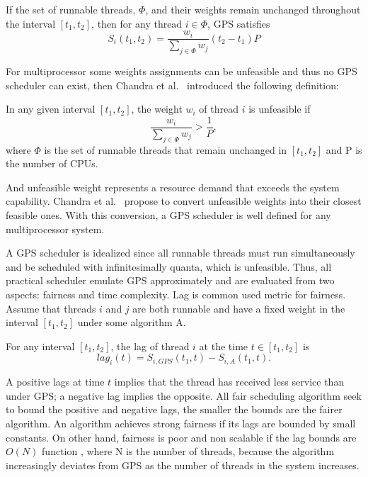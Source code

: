 \documentclass[11pt]{article}
\begin{document}
\begin{gps-props}
If the set of runnable threads, $\Phi$, and their weights remain unchanged throughout  the interval $[t_1, t_2]$, then for any thread $i \in \Phi$, GPS satisfies
$$S_i(t_1, t_2) = \frac{w_i}{\sum_{j \in \Phi} w_j}(t_2 - t_1)P$$
\end{gps-props}

For multiprocessor some weights assignments can be unfeasible  and thus no GPS scheduler can exist, then Chandra et al.~\cite{chandra00} introduced the following definition:

\begin{gps-model}
In any given interval $[t_1, t_2]$, the weight $w_i$ of thread $i$ is unfeasible if
$$\frac{w_i}{\sum_{j \in \Phi}w_j} > \frac{1}{P},$$
where $\Phi$ is the set of runnable threads that remain unchanged in $[t_1, t_2]$ and P is the number of CPUs.
\end{gps-model} 

And unfeasible weight represents a resource demand that exceeds the system capability. Chandra et al.~\cite{chandra00} propose to convert unfeasible weights into their closest feasible ones. With this conversion, a GPS scheduler is well defined for any multiprocessor system.

A GPS scheduler is idealized since all runnable threads must run simultaneously and be scheduled with infinitesimally quanta, which is unfeasible. Thus, all practical scheduler emulate GPS approximately and are evaluated from two aspects: fairness and time complexity. Lag is common used metric for fairness. Assume that threads $i$ and $j$ are both runnable and have a fixed weight in the interval $[t_1, t_2]$ under some algorithm A.

\begin{gps-model}
For any interval $[t_1, t_2]$, the lag of thread $i$ at the time $t \in [t_1, t_2]$ is
$$lag_i(t) = S_{i, GPS}(t_1, t) - S_{i, A}(t_1, t).$$
\end{gps-model}

A positive lags at time $t$ implies that the thread has received less service than under GPS; a negative lag implies the opposite. All fair scheduling algorithm seek to bound the positive and negative lags, the smaller the bounds are the fairer algorithm. An algorithm achieves strong fairness if its lags are bounded by small constants. On other hand, fairness is poor and non scalable if the lag bounds are $O(N)$ function , where N is the number of threads, because the algorithm  increasingly deviates from GPS as the number of threads in the system increases.
\end{document}
